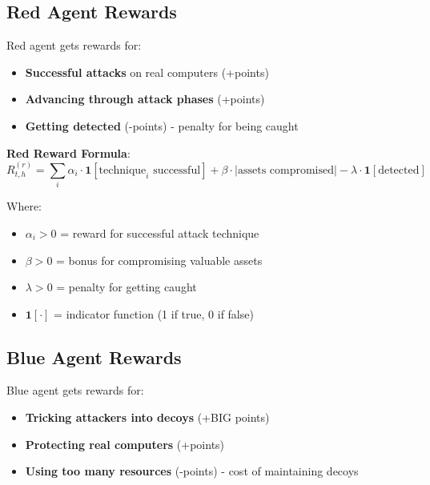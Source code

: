\documentclass[11pt]{article}
\begin{document}
\subsection{Red Agent Rewards}

\begin{intuition}
Red agent gets rewards for:
\begin{itemize}
\item \textbf{Successful attacks} on real computers (+points)
\item \textbf{Advancing through attack phases} (+points)
\item \textbf{Getting detected} (-points) - penalty for being caught
\end{itemize}
\end{intuition}

\begin{mathdetails}
\textbf{Red Reward Formula}:
$$R^{(r)}_{t,h} = \sum_i \alpha_i \cdot \mathbf{1}[\text{technique}_i \text{ successful}] + \beta \cdot |\text{assets compromised}| - \lambda \cdot \mathbf{1}[\text{detected}]$$

Where:
\begin{itemize}
\item $\alpha_i > 0$ = reward for successful attack technique
\item $\beta > 0$ = bonus for compromising valuable assets
\item $\lambda > 0$ = penalty for getting caught
\item $\mathbf{1}[\cdot]$ = indicator function (1 if true, 0 if false)
\end{itemize}
\end{mathdetails}

\subsection{Blue Agent Rewards}

\begin{intuition}
Blue agent gets rewards for:
\begin{itemize}
\item \textbf{Tricking attackers into decoys} (+BIG points)
\item \textbf{Protecting real computers} (+points)
\item \textbf{Using too many resources} (-points) - cost of maintaining decoys
\end{itemize}
\end{intuition}
\end{document}
